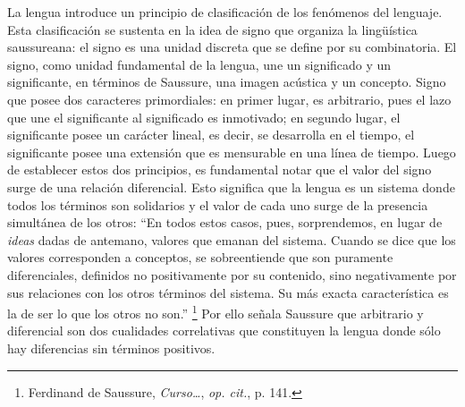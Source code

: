 \documentclass{book}
\begin{document}
La lengua introduce un principio de clasificación de los fenómenos del
lenguaje. Esta clasificación se sustenta en la idea de signo que
organiza la lingüística saussureana: el signo es una unidad discreta que
se define por su combinatoria. El signo, como unidad fundamental de la
lengua, une un significado y un significante, en términos de Saussure,
una imagen acústica y un concepto. Signo que posee dos caracteres
primordiales: en primer lugar, es arbitrario, pues el lazo que une el
significante al significado es inmotivado; en segundo lugar, el
significante posee un carácter lineal, es decir, se desarrolla en el
tiempo, el significante posee una extensión que es mensurable en una
línea de tiempo. Luego de establecer estos dos principios, es
fundamental notar que el valor del signo surge de una relación
diferencial. Esto significa que la lengua es un sistema donde todos los
términos son solidarios y el valor de cada uno surge de la presencia
simultánea de los otros: \enquote{En todos estos casos, pues, sorprendemos, en
lugar de \emph{ideas} dadas de antemano, valores que emanan del sistema.
Cuando se dice que los valores corresponden a conceptos, se
sobreentiende que son puramente diferenciales, definidos no
positivamente por su contenido, sino negativamente por sus relaciones
con los otros términos del sistema. Su más exacta característica es la
de ser lo que los otros no son.} \footnote{Ferdinand de Saussure,
  \emph{Curso\ldots{}}, \emph{op. cit.}, p. 141.} Por ello señala
Saussure que arbitrario y diferencial son dos cualidades correlativas
que constituyen la lengua donde sólo hay diferencias sin términos
positivos.
\end{document}
